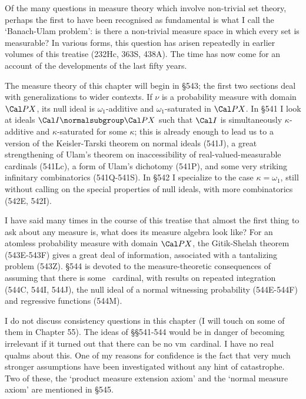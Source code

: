  
\def\chaptername{Real-valued-measurable cardinals} 
 
\def\pssqa{power set $\sigma$-quotient algebra} 
 
 
Of the many questions in measure theory which involve non-trivial set 
theory, perhaps the first to have been  
recognised as fundamental is what I call the `Banach-Ulam problem':   
is there a non-trivial measure space in which every set is measurable? 
In various forms, this question has arisen repeatedly in earlier volumes 
of this treatise (232Hc, 363S, 438A).   The time has now come for an 
account of the developments of the last fifty years. 
 
The measure theory of this chapter will begin in \S543;  the first two 
sections deal with generalizations to wider contexts.   If $\nu$ is a 
probability measure with domain $\Cal PX$, its null ideal is 
$\omega_1$-additive and $\omega_1$-saturated 
in $\Cal PX$.   In \S541 I look at ideals $\Cal I\normalsubgroup\Cal PX$ 
such that $\Cal I$ is simultaneously
$\kappa$-additive and $\kappa$-saturated for some 
$\kappa$;  this is already enough to lead us to  
a version of the Keisler-Tarski theorem on 
normal ideals (541J), a great strengthening of Ulam's theorem on 
inaccessibility of real-valued-measurable cardinals (541Lc), a form of 
Ulam's dichotomy (541P), and some very striking infinitary combinatorics 
(541Q-541S).   In \S542 I specialize to the case $\kappa=\omega_1$, still 
without calling on the special properties of null ideals, with more 
combinatorics (542E, 542I). 
 
I have said many times in the course of this treatise that almost the first 
thing to ask about any measure is, what does its measure algebra look like? 
For an atomless probability measure with domain $\Cal PX$, the Gitik-Shelah 
theorem (543E-543F) gives a great deal of information, associated with a
tantalizing problem (543Z).   \S544 is devoted to the measure-theoretic 
consequences of assuming that there is some \am\ cardinal, with results on 
repeated integration (544C, 544I, 544J),  
the null ideal of a normal witnessing 
probability (544E-544F) and regressive functions (544M). 
 
I do not discuss consistency questions in this chapter (I will touch on 
some of them in Chapter 55).    
The ideas of \S\S541-544 would be in danger of becoming irrelevant if it 
turned out that there can be no \2vm\ cardinal.   I have no real qualms 
about this.   One of my reasons for 
confidence is the fact that very much stronger assumptions have been 
investigated without any hint of catastrophe.   Two of these, the `product 
measure extension axiom' and the `normal measure axiom' are mentioned in 
\S545. 
 
